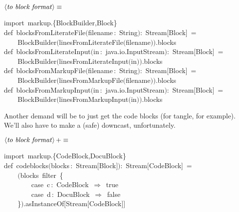 \documentclass[a4paper,12pt]{article}
\begin{document}
$\left<\mbox{\emph{to block format}}\right>\equiv$
\begin{program}{\vem import}~markup.{\small\{}BlockBuilder,Block{\small\}}
\\{\vem def}~blocksFromLiterateFile$($filename\,{\rm :}~String$)${\rm :}~Stream$[$Block$]$~=
\\~~~~BlockBuilder$($linesFromLiterateFile$($filename$)$$)$.blocks
\\[0.5em]{\vem def}~blocksFromLiterateInput$($in\,{\rm :}~java.io.InputStream$)${\rm :}~Stream$[$Block$]$~=
\\~~~~BlockBuilder$($linesFromLiterateInput$($in$)$$)$.blocks
\\[0.5em]{\vem def}~blocksFromMarkupFile$($filename\,{\rm :}~String$)${\rm :}~Stream$[$Block$]$~=
\\~~~~BlockBuilder$($linesFromMarkupFile$($filename$)$$)$.blocks
\\[0.5em]{\vem def}~blocksFromMarkupInput$($in\,{\rm :}~java.io.InputStream$)${\rm :}~Stream$[$Block$]$~=
\\~~~~BlockBuilder$($linesFromMarkupInput$($in$)$$)$.blocks
\\[0.5em]\end{program}



Another demand will be to just get the code blocks (for tangle, for example).
We'll also have to make a (safe) downcast, unfortunately.

$\left<\mbox{\emph{to block format}}\right>+\equiv$
\begin{program}{\vem import}~markup.{\small\{}CodeBlock,DocuBlock{\small\}}
\\{\vem def}~codeblocks$($blocks\,{\rm :}~Stream$[$Block$]$$)${\rm :}~Stream$[$CodeBlock$]$~=
\\~~~~$($blocks~filter~{\small\{}
\\~~~~~~~~{\vem case}~c\,{\rm :}~CodeBlock~$\Rightarrow$~{\vem true}
\\~~~~~~~~{\vem case}~d\,{\rm :}~DocuBlock~$\Rightarrow$~{\vem false}
\\~~~~{\small\}}$)$.asInstanceOf$[$Stream$[$CodeBlock$]$$]$
\end{program}
\end{document}

